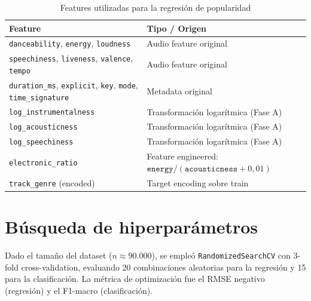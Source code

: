 \documentclass[12pt, a4paper, twoside]{book}
\theoremstyle{definition}
\begin{document}
\begin{table}[H]
\centering
\caption{Features utilizadas para la regresión de popularidad}
\label{tab:features_reg}
\small
{}
\begin{tabular}{ll}
\toprule
\textbf{Feature} & \textbf{Tipo / Origen} \\
\midrule
\texttt{danceability}, \texttt{energy}, \texttt{loudness} & Audio feature original \\
\texttt{speechiness}, \texttt{liveness}, \texttt{valence}, \texttt{tempo} & Audio feature original \\
\texttt{duration\_ms}, \texttt{explicit}, \texttt{key}, \texttt{mode}, \texttt{time\_signature} & Metadata original \\
\texttt{log\_instrumentalness} & Transformación logarítmica (Fase A) \\
\texttt{log\_acousticness} & Transformación logarítmica (Fase A) \\
\texttt{log\_speechiness} & Transformación logarítmica (Fase A) \\
\texttt{electronic\_ratio} & Feature engineered: $\texttt{energy} / (\texttt{acousticness}+0{,}01)$ \\
\texttt{track\_genre} (encoded) & Target encoding sobre train \\
\bottomrule
\end{tabular}
\end{table}

\section{Búsqueda de hiperparámetros}

Dado el tamaño del dataset ($n \approx 90.000$), se empleó
\texttt{RandomizedSearchCV} con 3-fold cross-validation, evaluando 20
combinaciones aleatorias para la regresión y 15 para la clasificación. La
métrica de optimización fue el RMSE negativo (regresión) y el F1-macro
(clasificación).
\end{document}
